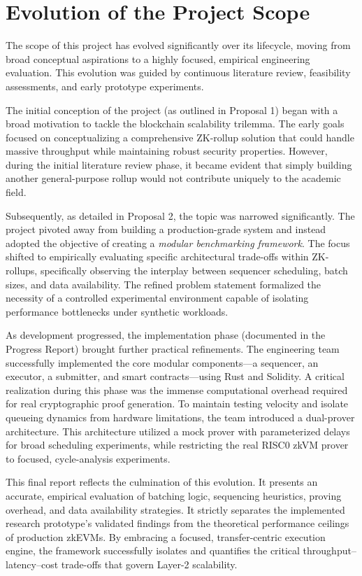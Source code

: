 \section{Evolution of the Project Scope}
\label{sec:evolution}

The scope of this project has evolved significantly over its lifecycle, moving from broad conceptual aspirations to a highly focused, empirical engineering evaluation. This evolution was guided by continuous literature review, feasibility assessments, and early prototype experiments.

The initial conception of the project (as outlined in Proposal 1) began with a broad motivation to tackle the blockchain scalability trilemma. The early goals focused on conceptualizing a comprehensive ZK-rollup solution that could handle massive throughput while maintaining robust security properties. However, during the initial literature review phase, it became evident that simply building another general-purpose rollup would not contribute uniquely to the academic field.

Subsequently, as detailed in Proposal 2, the topic was narrowed significantly. The project pivoted away from building a production-grade system and instead adopted the objective of creating a \textit{modular benchmarking framework}. The focus shifted to empirically evaluating specific architectural trade-offs within ZK-rollups, specifically observing the interplay between sequencer scheduling, batch sizes, and data availability. The refined problem statement formalized the necessity of a controlled experimental environment capable of isolating performance bottlenecks under synthetic workloads.

As development progressed, the implementation phase (documented in the Progress Report) brought further practical refinements. The engineering team successfully implemented the core modular components—a sequencer, an executor, a submitter, and smart contracts—using Rust and Solidity. A critical realization during this phase was the immense computational overhead required for real cryptographic proof generation. To maintain testing velocity and isolate queueing dynamics from hardware limitations, the team introduced a dual-prover architecture. This architecture utilized a mock prover with parameterized delays for broad scheduling experiments, while restricting the real RISC0 zkVM prover to focused, cycle-analysis experiments.

This final report reflects the culmination of this evolution. It presents an accurate, empirical evaluation of batching logic, sequencing heuristics, proving overhead, and data availability strategies. It strictly separates the implemented research prototype's validated findings from the theoretical performance ceilings of production zkEVMs. By embracing a focused, transfer-centric execution engine, the framework successfully isolates and quantifies the critical throughput--latency--cost trade-offs that govern Layer-2 scalability.